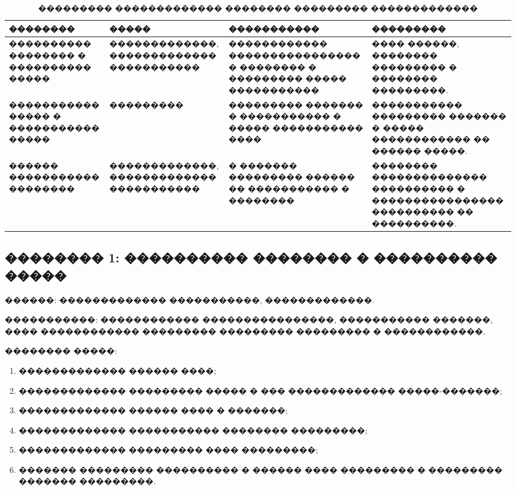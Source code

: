 \begin{table}[H]
\centering
\caption{��������� ������������� �������� ��������� �������������}
\label{tab:design-scenarios}
{\fontsize{12pt}{12pt}\selectfont
\setlength{\tabcolsep}{4pt}
\setlength{\extrarowheight}{1pt}
\renewcommand{\arraystretch}{1}
\begin{tabularx}{\textwidth}{|>{\RaggedRight\arraybackslash}p{28mm}|>{\RaggedRight\arraybackslash}p{34mm}|>{\RaggedRight\arraybackslash}p{28mm}|>{\RaggedRight\arraybackslash}X|}
\hline
�������� & ����� & ����������� & ��������� \\
\hline
���������� �������� � ���������� ����� & �������������, ������������� ����������� & ������������ ���������������� � �������� � ��������� ����� ����������� & ���� ������, �������� ��������� � �������� ���������. \\
\hline
����������� ����� � ����������� ����� & ��������� & ��������� ������� � ����������� � ����� ����������� ���� & ����������� ��������� ������� � ����� ������������ �� ������ �����. \\
\hline
������ ����������� �������� & �������������, ������������� ����������� & � ������� ��������� ������ �� ����������� � �������� & �������� �������������� ���������� � ���������������� ���������� �� ����������. \\
\hline
\end{tabularx}
}
\end{table}

\subsection{�������� 1: ���������� �������� � ���������� �����}

������: ������������� �����������, �������������.

�����������: ������������ ����������������, ����������� �������, ���� ������������ ��������� ��������� ��������� � ������������.

�������� �����:
\begin{enumerate}
  \item ������������� ������ ����;
  \item ������������� ��������� ����� � ��� ������������� �����-�������;
  \item ������������� ������ ���� � �������;
  \item ������������� ����������� �������� ���������;
  \item ������������� ��������� ���� ���������;
  \item ������� ��������� ���������� � ������ ���� ��������� � ��������� ������� ���������.
\end{enumerate}

